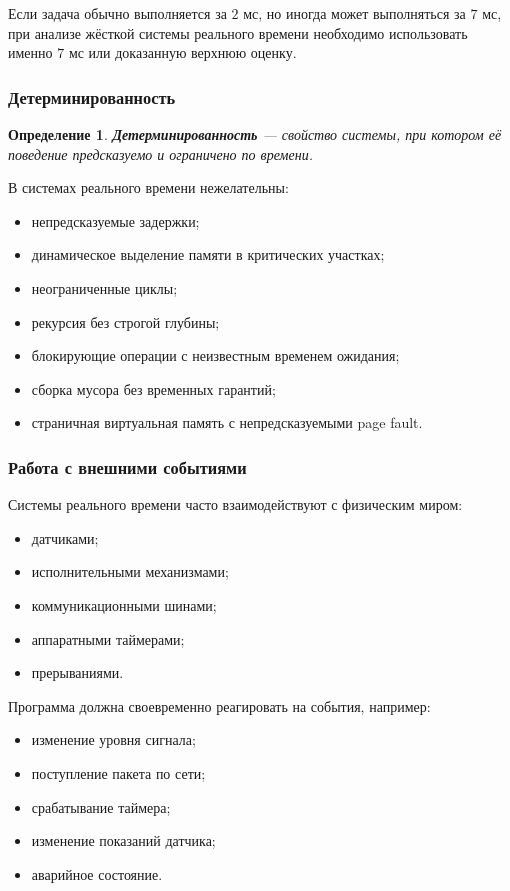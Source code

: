 \documentclass[12pt,a4paper]{article}
\newtheorem{definition}{Определение}
\begin{document}
Если задача обычно выполняется за $2$ мс, но иногда может выполняться за $7$ мс, при анализе жёсткой системы реального времени необходимо использовать именно $7$ мс или доказанную верхнюю оценку.

\subsubsection{Детерминированность}

\begin{definition}
\textbf{Детерминированность} --- свойство системы, при котором её поведение предсказуемо и ограничено по времени.
\end{definition}

В системах реального времени нежелательны:
\begin{itemize}
    \item непредсказуемые задержки;
    \item динамическое выделение памяти в критических участках;
    \item неограниченные циклы;
    \item рекурсия без строгой глубины;
    \item блокирующие операции с неизвестным временем ожидания;
    \item сборка мусора без временных гарантий;
    \item страничная виртуальная память с непредсказуемыми page fault.
\end{itemize}

\subsubsection{Работа с внешними событиями}

Системы реального времени часто взаимодействуют с физическим миром:
\begin{itemize}
    \item датчиками;
    \item исполнительными механизмами;
    \item коммуникационными шинами;
    \item аппаратными таймерами;
    \item прерываниями.
\end{itemize}

Программа должна своевременно реагировать на события, например:
\begin{itemize}
    \item изменение уровня сигнала;
    \item поступление пакета по сети;
    \item срабатывание таймера;
    \item изменение показаний датчика;
    \item аварийное состояние.
\end{itemize}
\end{document}
